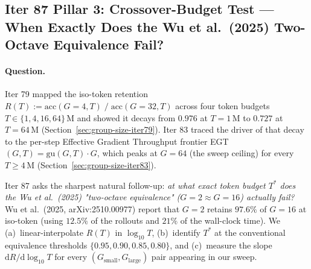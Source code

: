 \subsection{Iter 87 Pillar 3: Crossover-Budget Test --- When Exactly Does
              the Wu et al.\ (2025) Two-Octave Equivalence Fail?}
\label{sec:group-size-iter87}

\paragraph{Question.}
Iter 79 mapped the iso-token retention $R(T) := \mathrm{acc}(G{=}4,T)\;/\;
\mathrm{acc}(G{=}32,T)$ across four token budgets
$T \in \{1, 4, 16, 64\}\,\mathrm{M}$ and showed it decays from $0.976$
at $T{=}1\,\mathrm{M}$ to $0.727$ at $T{=}64\,\mathrm{M}$
(Section~\ref{sec:group-size-iter79}).  Iter 83 traced the driver of
that decay to the per-step Effective Gradient Throughput
frontier EGT$(G, T) = \mathrm{gu}(G, T) \cdot G$, which peaks at
$G{=}64$ (the sweep ceiling) for every $T \ge 4\,\mathrm{M}$
(Section~\ref{sec:group-size-iter83}).

Iter 87 asks the sharpest natural follow-up: \emph{at what exact token
budget $T^*$ does the Wu et al.\ (2025) "two-octave equivalence"
($G{=}2 \approx G{=}16$) actually fail?}  Wu et al.\ (2025,
arXiv:2510.00977) report that $G{=}2$ retains $97.6\%$ of $G{=}16$ at
iso-token (using $12.5\%$ of the rollouts and $21\%$ of the wall-clock
time).  We (a)~linear-interpolate $R(T)$ in $\log_{10} T$, (b)~identify
$T^*$ at the conventional equivalence thresholds $\{0.95, 0.90, 0.85,
0.80\}$, and (c)~measure the slope $\mathrm{d}R/\mathrm{d}\log_{10} T$
for every $(G_{\mathrm{small}}, G_{\mathrm{large}})$ pair appearing in
our sweep.

